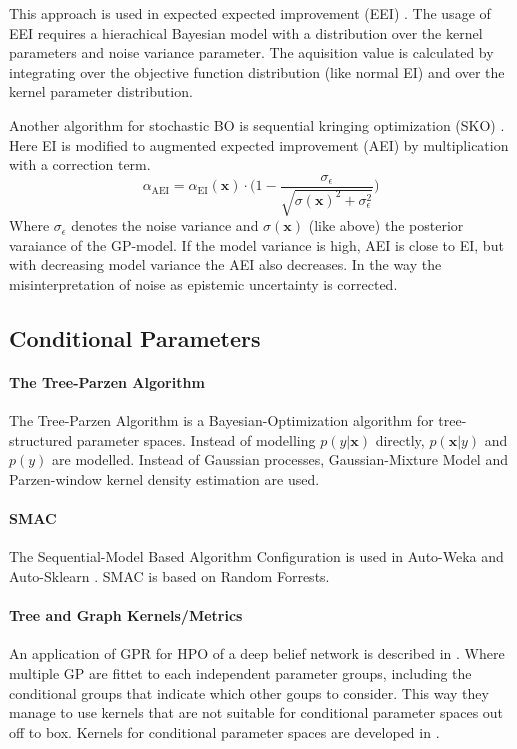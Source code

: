 \documentclass[english]{article}
\newcommand{\EI}{\operatorname{EI}}
\newcommand{\x}{\mathbf{x}}
\begin{document}
This approach is used in expected expected improvement (EEI) \cite{pandita_extending_2016}. The usage of EEI requires a hierachical Bayesian model with a distribution over the kernel parameters and noise variance parameter. The aquisition value is calculated by integrating over the objective function distribution (like normal EI) and over the kernel parameter distribution.

Another algorithm for stochastic BO is sequential kringing optimization (SKO) \cite{huang_global_2006}. Here EI is modified to augmented expected improvement (AEI) by multiplication with a correction term.
\begin{equation}
  \alpha_{\operatorname{AEI}} = \alpha_{\EI}(\x) \cdot \bigg(1 - \frac{\sigma_\epsilon}{\sqrt{\sigma(\x)^2 + \sigma_\epsilon^2}}\bigg)
\end{equation}
Where $\sigma_\epsilon$ denotes the noise variance and $\sigma(\x)$ (like above) the posterior varaiance of the GP-model. If the model variance is high, AEI is close to EI, but with decreasing model variance the AEI also decreases. In the way the misinterpretation of noise as epistemic uncertainty is corrected.


\subsection{Conditional Parameters}

\paragraph{The Tree-Parzen Algorithm}
The Tree-Parzen Algorithm \cite{bergstra_algorithms_2011} is a Bayesian-Optimization algorithm for tree-structured parameter spaces. Instead of modelling $p(y|\x)$ directly, $p(\x|y)$ and $p(y)$ are modelled. Instead of Gaussian processes, Gaussian-Mixture Model and Parzen-window kernel density estimation are used.

\paragraph{SMAC}
The Sequential-Model Based Algorithm Configuration \cite{hutter_sequential_2011} is used in Auto-Weka \cite{thornton_auto-weka:_2013} and Auto-Sklearn \cite{feurer_efficient_2015}. SMAC is based on Random Forrests.

\paragraph{Tree and Graph Kernels/Metrics}
An application of GPR for HPO of a deep belief network is described in \cite{bergstra_algorithms_2011}. Where multiple GP are fittet to each independent parameter groups, including the conditional groups that indicate which other goups to consider. This way they manage to use kernels that are not suitable for conditional parameter spaces out off to box. Kernels for conditional parameter spaces are developed in \cite{swersky_raiders_2014, chandar_hierarchical_2016}.
\end{document}
